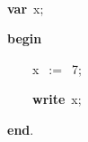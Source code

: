 
\fboxsep=0pt
\def\insert#1{$\fbox{#1}$}
\def\delete#1{$\fboxrule=.5mm\fbox{#1}$}
\rm
\ \par
{\bf var}\ x$;$\ \par
{\bf begin}\ \par
\ \ \ \ x\ $:=$\ 7$;$\ \par
\ \ \ \ {\bf write}\ x$;$\ \par
{\bf end}$.$

